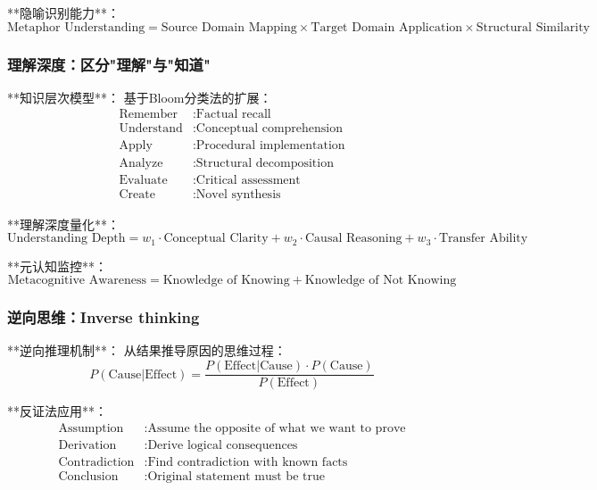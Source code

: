 **隐喻识别能力**：
\begin{equation}
\text{Metaphor Understanding} = \text{Source Domain Mapping} \times \text{Target Domain Application} \times \text{Structural Similarity}
\end{equation}

\subsubsection{理解深度：区分"理解"与"知道"} %

**知识层次模型**：
基于Bloom分类法的扩展：
\begin{align}
\text{Remember} &: \text{Factual recall} \\
\text{Understand} &: \text{Conceptual comprehension} \\
\text{Apply} &: \text{Procedural implementation} \\
\text{Analyze} &: \text{Structural decomposition} \\
\text{Evaluate} &: \text{Critical assessment} \\
\text{Create} &: \text{Novel synthesis}
\end{align}

**理解深度量化**：
\begin{equation}
\text{Understanding Depth} = w_1 \cdot \text{Conceptual Clarity} + w_2 \cdot \text{Causal Reasoning} + w_3 \cdot \text{Transfer Ability}
\end{equation}

**元认知监控**：
\begin{equation}
\text{Metacognitive Awareness} = \text{Knowledge of Knowing} + \text{Knowledge of Not Knowing}
\end{equation}

\subsubsection{逆向思维：Inverse thinking} %

**逆向推理机制**：
从结果推导原因的思维过程：
\begin{equation}
P(\text{Cause}|\text{Effect}) = \frac{P(\text{Effect}|\text{Cause}) \cdot P(\text{Cause})}{P(\text{Effect})}
\end{equation}

**反证法应用**：
\begin{align}
\text{Assumption} &: \text{Assume the opposite of what we want to prove} \\
\text{Derivation} &: \text{Derive logical consequences} \\
\text{Contradiction} &: \text{Find contradiction with known facts} \\
\text{Conclusion} &: \text{Original statement must be true}
\end{align}

